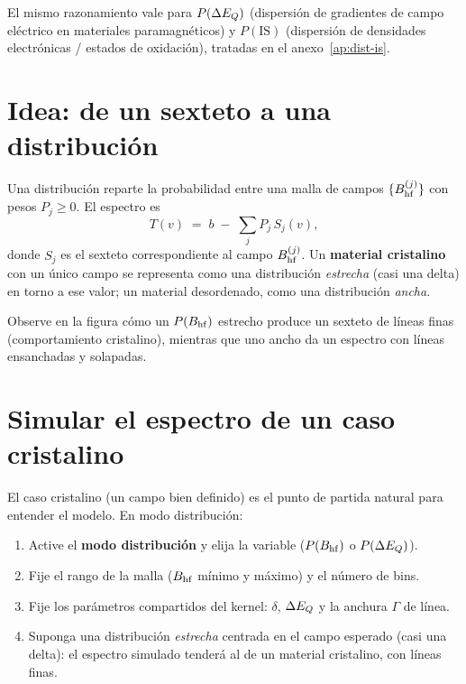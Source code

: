 El mismo razonamiento vale para $P(\Delta E_{Q})$ (dispersión de gradientes de campo
eléctrico en materiales paramagnéticos) y $P(\mathrm{IS})$ (dispersión de
densidades electrónicas / estados de oxidación), tratadas en el
anexo~\ref{ap:dist-is}.

\section{Idea: de un sexteto a una distribución}

Una distribución reparte la probabilidad entre una malla de campos
$\{B_{\mathrm{hf}}^{(j)}\}$ con pesos $P_j \ge 0$. El espectro es
\[
  T(v) \;=\; b \;-\; \sum_j P_j \, S_j(v),
\]
donde $S_j$ es el sexteto correspondiente al campo $B_{\mathrm{hf}}^{(j)}$. Un
\textbf{material cristalino} con un único campo se representa como una
distribución \emph{estrecha} (casi una delta) en torno a ese valor; un material
desordenado, como una distribución \emph{ancha}.


Observe en la figura cómo un $P(B_{\mathrm{hf}})$ estrecho produce un sexteto de líneas
finas (comportamiento cristalino), mientras que uno ancho da un espectro con
líneas ensanchadas y solapadas.

\section{Simular el espectro de un caso cristalino}
\label{sec:sim-cristalina}

El caso cristalino (un campo bien definido) es el punto de partida natural para
entender el modelo. En modo distribución:

\begin{enumerate}[nosep]
  \item Active el \textbf{modo distribución} y elija la variable ($P(B_{\mathrm{hf}})$ o
        $P(\Delta E_{Q})$).
  \item Fije el rango de la malla ($B_{\mathrm{hf}}$ mínimo y máximo) y el número de bins.
  \item Fije los parámetros compartidos del kernel: $\delta$, $\Delta E_{Q}$ y la anchura
        $\Gamma$ de línea.
  \item Suponga una distribución \emph{estrecha} centrada en el campo esperado
        (casi una delta): el espectro simulado tenderá al de un material
        cristalino, con líneas finas.
\end{enumerate}

